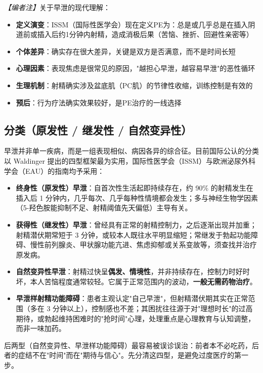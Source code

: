 \noindent\textit{【编者注】}关于早泄的现代理解：
\begin{itemize}
	\item \textbf{定义演变}：ISSM（国际性医学会）现在定义PE为：总是或几乎总是在插入阴道前或插入后约1分钟内射精，造成消极后果（苦恼、挫折、回避性亲密等）
	\item \textbf{个体差异}：确实存在很大差异，关键是双方是否满意，而不是时间长短
	\item \textbf{心理因素}：表现焦虑是很常见的原因，"越担心早泄，越容易早泄"的恶性循环
	\item \textbf{生理机制}：射精确实涉及盆底肌（PC肌）的节律性收缩，训练控制是有效的
	\item \textbf{预后}：行为疗法确实效果较好，是PE治疗的一线选择
\end{itemize}

\subsection{分类（原发性 / 继发性 / 自然变异性）}

早泄并非单一疾病，而是一组表现相似、病因各异的综合征。目前国际公认的分类以 Waldinger 提出的四型框架最为实用，国际性医学会（ISSM）与欧洲泌尿外科学会（EAU）的指南均予采用：

\begin{itemize}
	\item \textbf{终身性（原发性）早泄}：自首次性生活起即持续存在，约 90\% 的射精发生在插入后 1 分钟内，几乎每次、几乎每种性情境都会发生；多与神经生物学因素（5-羟色胺能抑制不足、射精阈值先天偏低）主导有关。
	\item \textbf{获得性（继发性）早泄}：曾经具有正常的射精控制力，之后逐渐出现并加重；射精潜伏期常短于 3 分钟，或较本人既往水平明显缩短；常继发于勃起功能障碍、慢性前列腺炎、甲状腺功能亢进、焦虑抑郁或关系变故等，须查找并治疗原发病。
	\item \textbf{自然变异性早泄}：射精过快呈\textbf{偶发、情境性}，并非持续存在，控制力时好时坏，本人苦恼程度通常较轻。它属于正常范围内的波动，\textbf{一般无需药物治疗}。
	\item \textbf{早泄样射精功能障碍}：患者主观认定"自己早泄"，但射精潜伏期其实在正常范围（多在 3 分钟以上），控制感也不差；其困扰往往源于对"理想时长"的过高期待，或勃起维持困难时的"抢时间"心理，处理重点是心理教育与认知调整，而非一味加药。
\end{itemize}

\begin{tcolorbox}[colback=pink!5!white,colframe=red!50!black,title=贴心小叮咛]
后两型（自然变异性、早泄样功能障碍）最容易被误诊误治：前者本不必吃药，后者的症结不在"时间"而在"期待与信心"。先分清这四型，是避免过度医疗的第一步。
\end{tcolorbox}

